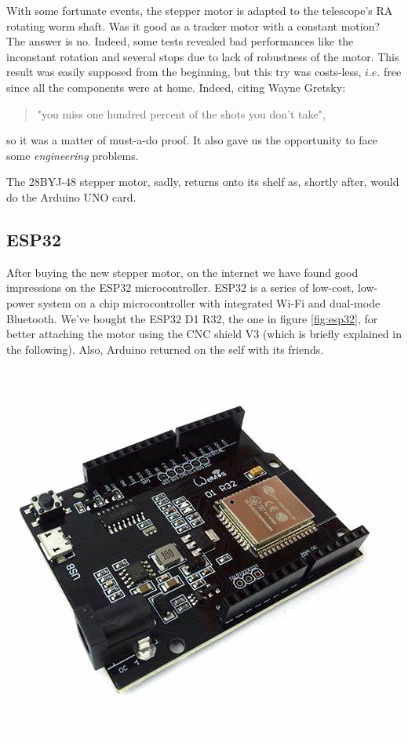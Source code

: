 \documentclass{article}
\begin{document}
\begin{multicols}{2}
        With some fortunate events, the stepper motor is adapted to the telescope's RA rotating worm shaft.
        Was it good as a tracker motor with a constant motion?
        The answer is no.
        Indeed, some tests revealed bad performances like the inconstant rotation and several stops due to lack of robustness of the motor.
        This result was easily supposed from the beginning, but this try was costs-less, \(i.e.\) free since all the components were at home.
        Indeed, citing Wayne Gretsky:
        \begin{quote}
            "you miss one hundred percent of the shots you don't take",
        \end{quote}
        so it was a matter of must-a-do proof.
        It also gave us the opportunity to face some \textit{engineering} problems.

        The 28BYJ-48 stepper motor, sadly, returns onto its shelf as, shortly after, would do the Arduino UNO card.

        \subsection{ESP32}
        After buying the new stepper motor, on the internet we have found good impressions on the ESP32 microcontroller.
        ESP32 is a series of low-cost, low-power system on a chip microcontroller with integrated Wi-Fi and dual-mode Bluetooth.
        We've bought the ESP32 D1 R32, the one in figure \ref{fig:esp32}, for better attaching the motor using the CNC shield V3 (which is briefly explained in the following).
        Also, Arduino returned on the self with its friends.
        
        \begin{minipage}
            {.5\textwidth}
            \centering
            \includegraphics[scale=0.25]{esp32_d1_r32.jpg}
            \label{fig:esp32}
        \end{minipage}


\end{multicols}
\end{document}
